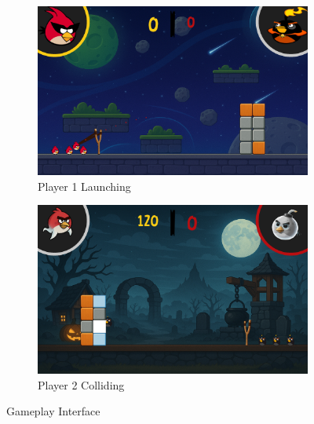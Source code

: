 \documentclass{article}
\begin{document}
\begin{figure}[h]
    \centering
    \begin{subfigure}[b]{0.45\textwidth}
        \centering
        \includegraphics[width=\textwidth]{Player1.png}
        \caption{Player 1 Launching}\label{fig:P1}   
    \end{subfigure}
    \hspace{0.05\textwidth}
    \begin{subfigure}[b]{0.45\textwidth}
        \centering
        \includegraphics[width=\textwidth]{Player2.png}
        \caption{Player 2 Colliding}\label{fig:P2}
    \end{subfigure}
    \caption{Gameplay Interface}\label{fig:Playing}
\end{figure}
\end{document}
